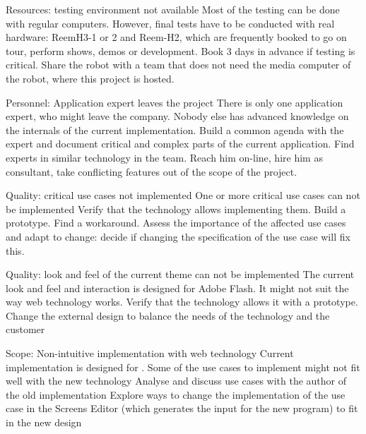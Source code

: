 \begin{risk}
{Resources: testing environment not available}
{Most of the testing can be done with regular computers. However, final tests have to be conducted with real hardware: ReemH3-1 or 2 and Reem-H2, which are frequently booked to go on tour, perform shows, demos or development.}
{Book 3 days in advance if testing is critical. }
{Share the robot with a team that does not need the media computer of the robot, where this project is hosted.}
\end{risk}

\begin{risk}
{Personnel: Application expert leaves the project}
{There is only one application expert, who might leave the company. Nobody else has advanced knowledge on the internals of the current implementation.}
{Build a common agenda with the expert and document critical and complex parts of the current application. Find experts in similar technology in the team.}
{Reach him on-line, hire him as consultant, take conflicting features out of the scope of the project.}
\end{risk}

\begin{risk}
{Quality: critical use cases not implemented}
{One or more critical use cases can not be implemented}
{Verify that the technology allows implementing them. Build a prototype. }
{Find a workaround. Assess the importance of the affected use cases and adapt to change: decide if changing the specification of the use case will fix this.}
\end{risk}

\begin{risk}
{Quality: look and feel of the current theme can not be implemented}
{The current look and feel and interaction is designed for Adobe Flash. It might not suit the way web technology works.}
{Verify that the technology allows it with a prototype.}
{Change the external design to balance the needs of the technology and the customer}
\end{risk}

\begin{risk}
{Scope: Non-intuitive implementation with web technology}
{Current implementation is designed for \flash . Some of the use cases to implement might not fit well with the new technology}
{Analyse and discuss use cases with the author of the old implementation}
{Explore ways to change the implementation of the use case in the Screens Editor (which generates the input for the new program) to fit in the new design}
\end{risk}

